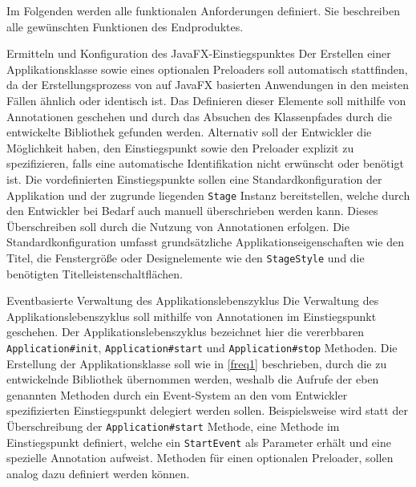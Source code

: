 Im Folgenden werden alle funktionalen Anforderungen definiert. Sie beschreiben alle gewünschten Funktionen des Endproduktes.
\begin{freq}{Ermitteln und Konfiguration des JavaFX-Einstiegspunktes}
	Der Erstellen einer Applikationsklasse sowie eines optionalen Preloaders soll automatisch stattfinden, da der Erstellungsprozess von auf JavaFX basierten Anwendungen in den meisten Fällen ähnlich oder identisch ist. Das Definieren dieser Elemente soll mithilfe von Annotationen geschehen und durch das Absuchen des Klassenpfades durch die entwickelte Bibliothek gefunden werden. Alternativ soll der Entwickler die Möglichkeit haben, den Einstiegspunkt sowie den Preloader explizit zu spezifizieren, falls eine automatische Identifikation nicht erwünscht oder benötigt ist. Die vordefinierten Einstiegspunkte sollen eine Standardkonfiguration der Applikation und der zugrunde liegenden \texttt{Stage} Instanz bereitstellen, welche durch den Entwickler bei Bedarf auch manuell überschrieben werden kann. Dieses Überschreiben soll durch die Nutzung von Annotationen erfolgen. Die Standardkonfiguration umfasst grundsätzliche Applikationseigenschaften wie den Titel, die Fenstergröße oder Designelemente wie den \texttt{StageStyle} und die benötigten Titelleistenschaltflächen.
\end{freq}
\begin{freq}{Eventbasierte Verwaltung des Applikationslebenszyklus}
	Die Verwaltung des Applikationslebenszyklus soll mithilfe von Annotationen im Einstiegspunkt geschehen. Der Applikationslebenszyklus bezeichnet hier die vererbbaren \texttt{Application\#init}, \texttt{Application\#start} und \texttt{Application\#stop} Methoden. Die Erstellung der Applikationsklasse soll wie in \autoref{freq1} beschrieben, durch die zu entwickelnde Bibliothek übernommen werden, weshalb die Aufrufe der eben genannten Methoden durch ein Event-System an den vom Entwickler spezifizierten Einstiegspunkt delegiert werden sollen. Beispielsweise wird statt der Überschreibung der \texttt{Application\#start} Methode, eine Methode im Einstiegspunkt definiert, welche ein \texttt{StartEvent} als Parameter erhält und eine spezielle Annotation aufweist. Methoden für einen optionalen Preloader, sollen analog dazu definiert werden können.
\end{freq}
